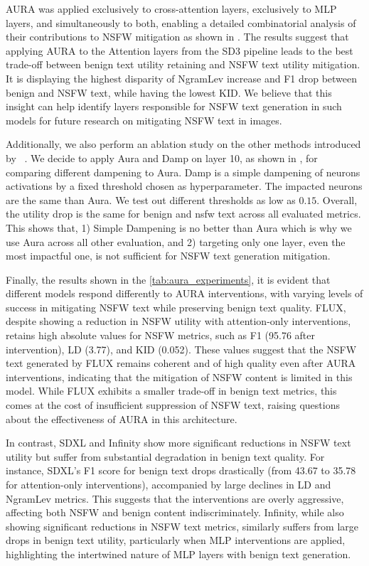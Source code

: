 AURA was applied exclusively to cross-attention layers, exclusively to MLP layers, and simultaneously to both, enabling a detailed combinatorial analysis of their contributions to NSFW mitigation as shown in . The results suggest that applying AURA to the Attention layers from the SD3 pipeline leads to the best trade-off between benign text utility retaining and NSFW text utility mitigation. It is displaying the highest disparity of NgramLev increase and F1 drop between benign and NSFW text, while having the lowest KID. We believe that this insight can help identify layers responsible for NSFW text generation in such models for future research on mitigating NSFW text in images.  


Additionally, we also perform an ablation study on the other methods introduced by ~\citep{suau2024whispering}. 
We decide to apply Aura and Damp on layer 10, as shown in , for comparing different dampening to Aura. Damp is a simple dampening of neurons activations by a fixed threshold chosen as hyperparameter. The impacted neurons are the same than Aura. We test out different thresholds as low as $0.15$. Overall, the utility drop is the same for benign and nsfw text across all evaluated metrics. This shows that, 1) Simple Dampening is no better than Aura which is why we use Aura across all other evaluation, and 2) targeting only one layer, even the most impactful one, is not sufficient for NSFW text generation mitigation.

Finally, the results shown in the \cref{tab:aura_experiments}, it is evident that different models respond differently to AURA interventions, with varying levels of success in mitigating NSFW text while preserving benign text quality. FLUX, despite showing a reduction in NSFW utility with attention-only interventions, retains high absolute values for NSFW metrics, such as F1 (95.76 after intervention), LD (3.77), and KID (0.052). These values suggest that the NSFW text generated by FLUX remains coherent and of high quality even after AURA interventions, indicating that the mitigation of NSFW content is limited in this model. While FLUX exhibits a smaller trade-off in benign text metrics, this comes at the cost of insufficient suppression of NSFW text, raising questions about the effectiveness of AURA in this architecture.

In contrast, SDXL and Infinity show more significant reductions in NSFW text utility but suffer from substantial degradation in benign text quality. For instance, SDXL's F1 score for benign text drops drastically (from 43.67 to 35.78 for attention-only interventions), accompanied by large declines in LD and NgramLev metrics. This suggests that the interventions are overly aggressive, affecting both NSFW and benign content indiscriminately. Infinity, while also showing significant reductions in NSFW text metrics, similarly suffers from large drops in benign text utility, particularly when MLP interventions are applied, highlighting the intertwined nature of MLP layers with benign text generation.

